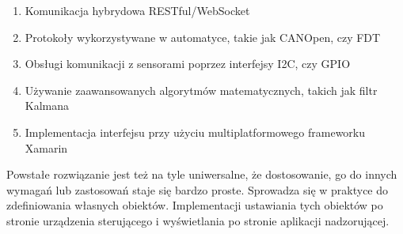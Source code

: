 \documentclass[a4paper,10pt]{article}
\begin{document}
\begin{enumerate}
    \item Komunikacja hybrydowa RESTful/WebSocket
    \item Protokoły wykorzystywane w automatyce, takie jak CANOpen\cite{CANOpenDictWiki}, czy FDT\cite{FDTWiki}
    \item Obsługi komunikacji z sensorami poprzez interfejsy I2C\cite{I2CWiki}, czy GPIO
    \item Używanie zaawansowanych algorytmów matematycznych, takich jak filtr Kalmana\cite{KalmanWiki}
    \item Implementacja interfejsu przy użyciu multiplatformowego frameworku Xamarin\cite{XamarinWiki}
\end{enumerate}

Powstałe rozwiązanie jest też na tyle uniwersalne, że dostosowanie, go do innych wymagań lub zastosowań staje się bardzo proste. Sprowadza się w praktyce do zdefiniowania własnych obiektów. Implementacji ustawiania tych obiektów po stronie urządzenia sterującego i wyświetlania po stronie aplikacji nadzorującej. 


\end{document}
